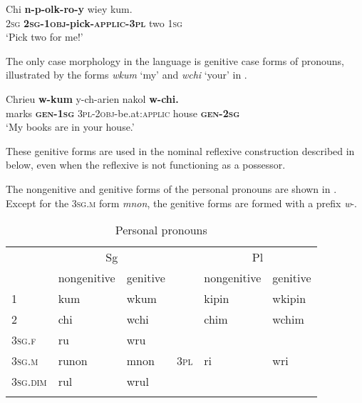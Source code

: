 \documentclass[output=paper]{langscibook}
\begin{document}
\ea%
    \label{ex:Brown:7}
    \gll Chi  \textbf{n-p-olk-ro-y}  wiey  kum.\\
         \textsc{2sg}  \textbf{\textsc{2sg-1obj}}\textbf{{}-pick-}\textbf{\textsc{applic-3pl}}  two  \textsc{1sg}\\
    \glt ‘Pick two for me!’  
    \z

  The only case morphology in the language is genitive case forms of pronouns, illustrated by the forms \emph{wkum} ‘my’ and \emph{wchi} ‘your’ in .

\ea%
    \label{ex:Brown:8}
    \gll Chrieu  \textbf{w-kum}  y-ch-arien  nakol  \textbf{w-chi.}\\
        marks  \textbf{\textsc{gen}}\textbf{{}-}\textbf{\textsc{1sg}}  \textsc{3pl}{}-\textsc{2obj}{}-be.at:\textsc{applic}  house  \textbf{\textsc{gen}}\textbf{{}-}\textbf{\textsc{2sg}}\\
    \glt  ‘My books are in your house.’
    \z

These genitive forms are used in the nominal reflexive construction described in  below, even when the reflexive is not functioning as a possessor. 



 The nongenitive and genitive forms of the personal pronouns are shown in . Except for the \textsc{3sg.m} form \emph{mnon}, the genitive forms are formed with a prefix \emph{w}{}-.


\begin{table}
\begin{tabularx}{\textwidth}{XXXp{0.5cm}XX}
 \lsptoprule
 & \multicolumn{2}{c}{Sg} & & \multicolumn{2}{c}{Pl}\\
 \cmidrule{2-3} \cmidrule{5-6}
 & {nongenitive} & {genitive} &  & {nongenitive} & {genitive}\\
 \hline
1  & kum  & wkum    & &  kipin &  wkipin\\
2  & chi & wchi   & &   chim & wchim\\
\textsc{3sg.f}  & ru  & wru   & \multirow{3}{*}{\textsc{3pl}} & \multirow{3}{*}{ri} & \multirow{3}{*}{wri}    \\
\textsc{3sg.m} & runon & mnon & & \\
\textsc{3sg.dim} & rul  & wrul    & &   \\
\lspbottomrule
\end{tabularx}
\caption{Personal pronouns}\label{tab:Brown:2}
\end{table}
\end{document}
